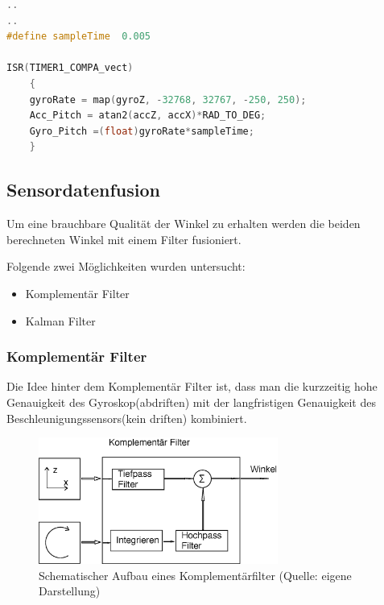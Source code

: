 \begin{lstlisting}[language=C++, caption=Berechnen der Winkel, label={lst:Winkel}]
..
..
#define sampleTime  0.005

ISR(TIMER1_COMPA_vect)
 	{
 	gyroRate = map(gyroZ, -32768, 32767, -250, 250);
	Acc_Pitch = atan2(accZ, accX)*RAD_TO_DEG;
	Gyro_Pitch =(float)gyroRate*sampleTime;
	}
\end{lstlisting}

\subsection{Sensordatenfusion}
Um eine brauchbare Qualität der Winkel zu erhalten werden die beiden berechneten Winkel mit einem Filter fusioniert.

Folgende zwei Möglichkeiten wurden untersucht:
\begin{itemize}
	\item Komplementär Filter
	\item Kalman Filter
\end{itemize}

\subsubsection{Komplementär Filter}
Die Idee hinter dem Komplementär Filter ist, dass man die kurzzeitig hohe Genauigkeit des Gyroskop(abdriften) mit der langfristigen Genauigkeit des Beschleunigungssensors(kein driften) kombiniert.

\begin{figure}[h]  %
\centering\includegraphics[width=0.7\textwidth]{images/komplementaerfilter.eps}
\caption{Schematischer Aufbau eines Komplementärfilter \newline (Quelle: eigene Darstellung)}
\label{Komplementärfilter} %
\end{figure}

